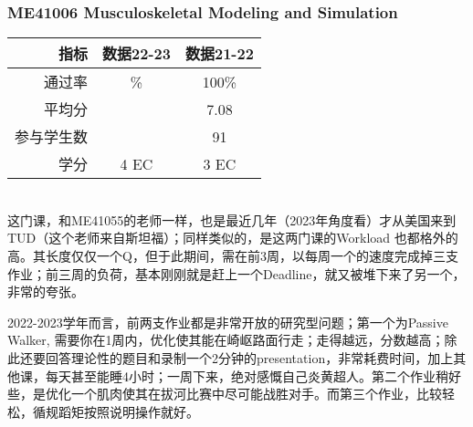 \subsubsection{ME41006 Musculoskeletal Modeling and Simulation}
\begin{minipage}{0.45\textwidth}
\centering
{}
\end{minipage}%
\begin{minipage}{0.45\textwidth}
\raggedleft
\begin{tabular}{r|c|c}
\textbf{指标} & \textbf{数据22-23} & \textbf{数据21-22}\\ \hline
通过率 & \% & 100\%\\ 
平均分 &   & 7.08\\ 
参与学生数 &  & 91\\
学分 & 4 EC & 3 EC\\
\end{tabular}
\end{minipage}\\

这门课，和ME41055的老师一样，也是最近几年（2023年角度看）才从美国来到TUD（这个老师来自斯坦福）；同样类似的，是这两门课的Workload 也都格外的高。其长度仅仅一个Q，但于此期间，需在前3周，以每周一个的速度完成掉三支作业；前三周的负荷，基本刚刚就是赶上一个Deadline，就又被堆下来了另一个，非常的夸张。

2022-2023学年而言，前两支作业都是非常开放的研究型问题；第一个为Passive Walker, 需要你在1周内，优化使其能在崎岖路面行走；走得越远，分数越高；除此还要回答理论性的题目和录制一个2分钟的presentation，非常耗费时间，加上其他课，每天甚至能睡4小时；一周下来，绝对感慨自己炎黄超人。第二个作业稍好些，是优化一个肌肉使其在拔河比赛中尽可能战胜对手。而第三个作业，比较轻松，循规蹈矩按照说明操作就好。

